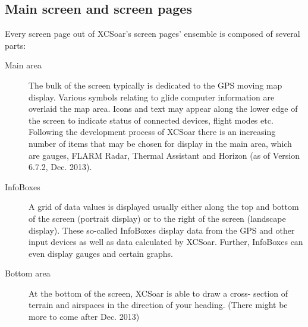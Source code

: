 \subsection*{Main screen and screen pages}
Every screen page out of XCSoar's screen pages' ensemble is composed of several 
parts:
\begin{description}
\item[Main area] The bulk of the screen typically is dedicated to the GPS moving 
map display. Various symbols relating to glide computer information are overlaid 
the map area. Icons and text may appear along the lower edge of the screen
to indicate status of connected devices, flight modes etc.
Following the development process of XCSoar there is an increasing number of 
items that may be chosen for display in the main area, which are gauges,
FLARM Radar, Thermal Assistant and Horizon (as of Version 6.7.2,
Dec. 2013).
\item[InfoBoxes] A grid of data values is displayed usually either along
the top and bottom of the screen (portrait display) or to the right of the
screen (landscape display).  These so-called InfoBoxes display data from the
GPS and other input devices as well as data calculated by XCSoar. Further, 
InfoBoxes can even display gauges and certain graphs.
\item[Bottom area] At the bottom of the screen, XCSoar is able to draw a cross-
section of terrain and airspaces in the direction of your heading. (There might be
more to come after Dec. 2013) %
\end{description}

